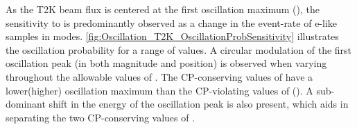 As the T2K beam flux is centered at the first oscillation maximum (), the sensitivity to  is predominantly observed as a change in the event-rate of e-like samples in \quickmath{\nu/\bar{\nu}} modes. \autoref{fig:Oscillation_T2K_OscillationProbSensitivity} illustrates the  oscillation probability for a range of  values. %
A circular modulation of the first oscillation peak (in both magnitude and position) is observed when varying throughout the allowable values of . The CP-conserving values of  have a lower(higher) oscillation maximum than the CP-violating values of (). A sub-dominant shift in the energy of the oscillation peak is also present, which aids in separating the two CP-conserving values of .

